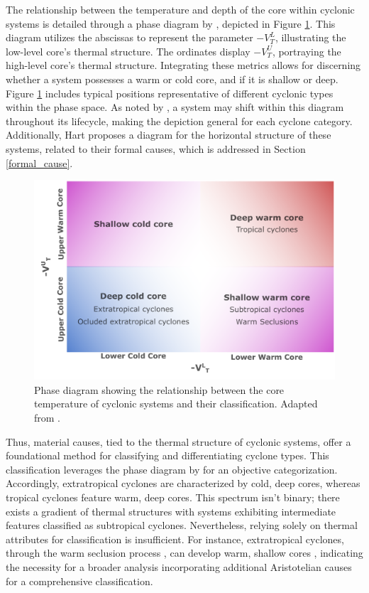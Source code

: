 The relationship between the temperature and depth of the core within cyclonic systems is detailed through a phase diagram by \citet{hart2003cyclone}, depicted in Figure \ref{phase_space_Hart_1}. This diagram utilizes the abscissas to represent the parameter \(-V^{L}_{T}\), illustrating the low-level core's thermal structure. The ordinates display \(-V^{U}_{T}\), portraying the high-level core's thermal structure. Integrating these metrics allows for discerning whether a system possesses a warm or cold core, and if it is shallow or deep. Figure \ref{phase_space_Hart_1} includes typical positions representative of different cyclonic types within the phase space. As noted by \citet{hart2003cyclone}, a system may shift within this diagram throughout its lifecycle, making the depiction general for each cyclone category. Additionally, Hart proposes a diagram for the horizontal structure of these systems, related to their formal causes, which is addressed in Section \ref{formal_cause}.

\begin{figure}[h]
\begin{center}
\setcaptionmargin{1cm}
\includegraphics[width=0.7\columnwidth,angle=0]{fig/hart_diagram_1.pdf}
\caption[Phase Diagram - Hart]{Phase diagram showing the relationship between the core temperature of cyclonic systems and their classification. Adapted from \citet{hart2003cyclone}.} 
\label{phase_space_Hart_1}
\end{center}
\end{figure}

Thus, material causes, tied to the thermal structure of cyclonic systems, offer a foundational method for classifying and differentiating cyclone types. This classification leverages the phase diagram by \citet{hart2003cyclone} for an objective categorization. Accordingly, extratropical cyclones are characterized by cold, deep cores, whereas tropical cyclones feature warm, deep cores. This spectrum isn't binary; there exists a gradient of thermal structures with systems exhibiting intermediate features classified as subtropical cyclones. Nevertheless, relying solely on thermal attributes for classification is insufficient. For instance, extratropical cyclones, through the warm seclusion process \citep[e.g.]{shapiro1990fronts}, can develop warm, shallow cores \citep{hart2003cyclone}, indicating the necessity for a broader analysis incorporating additional Aristotelian causes for a comprehensive classification.

